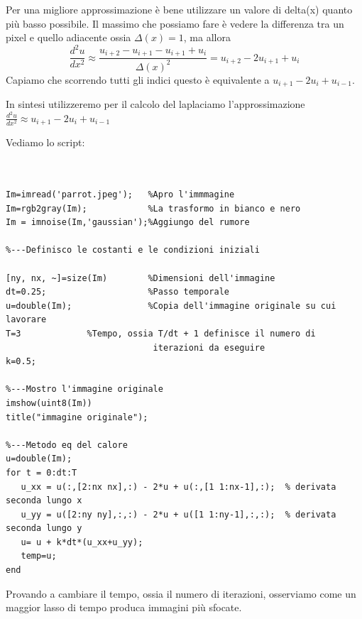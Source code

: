 Per una migliore approssimazione è bene utilizzare un valore di delta(x) quanto più basso possibile. Il massimo che possiamo fare è vedere la differenza tra un pixel e quello adiacente ossia $\Delta(x)=1$, ma allora 
$$\frac{d^2u}{dx^2} \approx
\frac{
 u_{i+2} - u_{i+1} 
-u_{i+1} + u_i}
{\Delta(x)^2} = u_{i+2} -2 u_{i+1} + u_i$$
Capiamo che scorrendo tutti gli indici questo è equivalente a $u_{i+1} -2 u_i + u_{i-1}.$

In sintesi utilizzeremo per il calcolo del laplaciamo l'approssimazione \\
\vspace{2pt}
\centering 
$\frac{d^2u}{dx^2} \approx u_{i+1} -2 u_i + u_{i-1}$\\
\vspace{2pt}
\raggedright
Vediamo lo script:

\begin{lstlisting}


Im=imread('parrot.jpeg');   %Apro l'immmagine
Im=rgb2gray(Im);            %La trasformo in bianco e nero
Im = imnoise(Im,'gaussian');%Aggiungo del rumore

%---Definisco le costanti e le condizioni iniziali

[ny, nx, ~]=size(Im)        %Dimensioni dell'immagine
dt=0.25;                    %Passo temporale
u=double(Im);               %Copia dell'immagine originale su cui lavorare
T=3			    %Tempo, ossia T/dt + 1 definisce il numero di
                             iterazioni da eseguire
k=0.5;

%---Mostro l'immagine originale
imshow(uint8(Im))
title("immagine originale"); 

%---Metodo eq del calore
u=double(Im);
for t = 0:dt:T
   u_xx = u(:,[2:nx nx],:) - 2*u + u(:,[1 1:nx-1],:);  % derivata seconda lungo x
   u_yy = u([2:ny ny],:,:) - 2*u + u([1 1:ny-1],:,:);  % derivata seconda lungo y
   u= u + k*dt*(u_xx+u_yy);
   temp=u;
end

\end{lstlisting}
\vspace{1em}
Provando a cambiare il tempo, ossia il numero di iterazioni, osserviamo come un maggior lasso di tempo produca immagini più sfocate. \\

